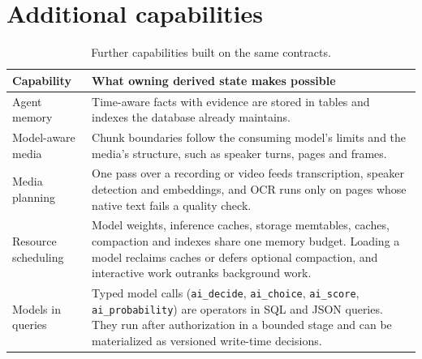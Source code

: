 \documentclass[sigconf,nonacm]{acmart}
\begin{document}



\appendix
\section{Additional capabilities}
\label{app:capabilities}

\begin{table}[H]
  \caption{Further capabilities built on the same contracts.}
  \label{tab:more-capabilities}
  \small
  \begin{tabularx}{\columnwidth}{@{}p{}L@{}}
    \toprule
    Capability & What owning derived state makes possible \\
    \midrule
    Agent memory & Time-aware facts with evidence are stored in tables and indexes the database already maintains. \\
    Model-aware media & Chunk boundaries follow the consuming model's limits and the media's structure, such as speaker turns, pages and frames. \\
    Media planning & One pass over a recording or video feeds transcription, speaker detection and embeddings, and OCR runs only on pages whose native text fails a quality check. \\
    Resource scheduling & Model weights, inference caches, storage memtables, caches, compaction and indexes share one memory budget. Loading a model reclaims caches or defers optional compaction, and interactive work outranks background work. \\
    Models in queries & Typed model calls (\texttt{ai\_decide}, \texttt{ai\_choice}, \texttt{ai\_score}, \texttt{ai\_probability}) are operators in SQL and JSON queries. They run after authorization in a bounded stage and can be materialized as versioned write-time decisions. \\
    \bottomrule
  \end{tabularx}
\end{table}
\end{document}
